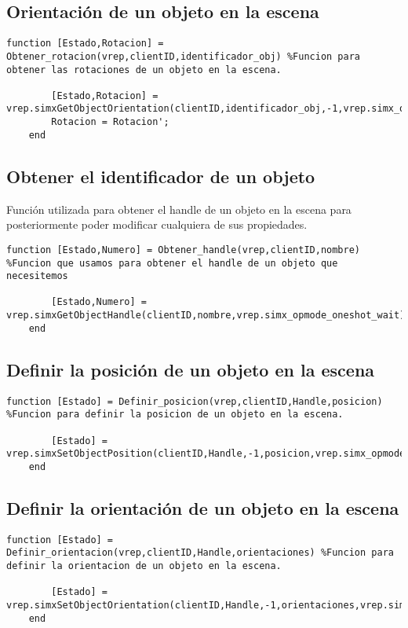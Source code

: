 \subsection{Orientación de un objeto en la escena}
\begin{lstlisting}[frame=single]
function [Estado,Rotacion] = Obtener_rotacion(vrep,clientID,identificador_obj) %Funcion para obtener las rotaciones de un objeto en la escena.
        
        [Estado,Rotacion] = vrep.simxGetObjectOrientation(clientID,identificador_obj,-1,vrep.simx_opmode_oneshot_wait);
        Rotacion = Rotacion';
    end
\end{lstlisting}
\subsection{Obtener el identificador de un objeto}
Función utilizada para obtener el handle de un objeto en la escena para posteriormente poder modificar cualquiera de sus propiedades.
\begin{lstlisting}[frame=single]
 function [Estado,Numero] = Obtener_handle(vrep,clientID,nombre) %Funcion que usamos para obtener el handle de un objeto que necesitemos 
        
        [Estado,Numero] = vrep.simxGetObjectHandle(clientID,nombre,vrep.simx_opmode_oneshot_wait);
    end
\end{lstlisting}
\subsection{Definir la posición de un objeto en la escena}
\begin{lstlisting}[frame=single]
function [Estado] = Definir_posicion(vrep,clientID,Handle,posicion) %Funcion para definir la posicion de un objeto en la escena.
       
        [Estado] = vrep.simxSetObjectPosition(clientID,Handle,-1,posicion,vrep.simx_opmode_oneshot);
    end
\end{lstlisting}
\subsection{Definir la orientación de un objeto en la escena}
\begin{lstlisting}[frame=single]
   function [Estado] = Definir_orientacion(vrep,clientID,Handle,orientaciones) %Funcion para definir la orientacion de un objeto en la escena.
        
        [Estado] = vrep.simxSetObjectOrientation(clientID,Handle,-1,orientaciones,vrep.simx_opmode_oneshot);
    end
\end{lstlisting}
